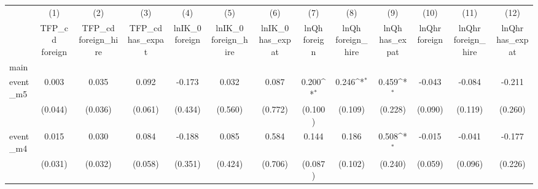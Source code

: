 {
\def\sym#1{\ifmmode^{#1}\else\(^{#1}\)\fi}
\begin{tabular}{l*{12}{c}}
\hline\hline
            &\multicolumn{1}{c}{(1)}&\multicolumn{1}{c}{(2)}&\multicolumn{1}{c}{(3)}&\multicolumn{1}{c}{(4)}&\multicolumn{1}{c}{(5)}&\multicolumn{1}{c}{(6)}&\multicolumn{1}{c}{(7)}&\multicolumn{1}{c}{(8)}&\multicolumn{1}{c}{(9)}&\multicolumn{1}{c}{(10)}&\multicolumn{1}{c}{(11)}&\multicolumn{1}{c}{(12)}\\
            &\multicolumn{1}{c}{TFP\_cd  foreign}&\multicolumn{1}{c}{TFP\_cd  foreign\_hire}&\multicolumn{1}{c}{TFP\_cd  has\_expat}&\multicolumn{1}{c}{lnIK\_0  foreign}&\multicolumn{1}{c}{lnIK\_0  foreign\_hire}&\multicolumn{1}{c}{lnIK\_0  has\_expat}&\multicolumn{1}{c}{lnQh  foreign}&\multicolumn{1}{c}{lnQh  foreign\_hire}&\multicolumn{1}{c}{lnQh  has\_expat}&\multicolumn{1}{c}{lnQhr  foreign}&\multicolumn{1}{c}{lnQhr  foreign\_hire}&\multicolumn{1}{c}{lnQhr  has\_expat}\\
\hline
main        &                     &                     &                     &                     &                     &                     &                     &                     &                     &                     &                     &                     \\
event\_m5    &       0.003         &       0.035         &       0.092         &      -0.173         &       0.032         &       0.087         &       0.200\sym{*}  &       0.246\sym{*}  &       0.459\sym{*}  &      -0.043         &      -0.084         &      -0.211         \\
            &     (0.044)         &     (0.036)         &     (0.061)         &     (0.434)         &     (0.560)         &     (0.772)         &     (0.100)         &     (0.109)         &     (0.228)         &     (0.090)         &     (0.119)         &     (0.260)         \\
[1em]
event\_m4    &       0.015         &       0.030         &       0.084         &      -0.188         &       0.085         &       0.584         &       0.144         &       0.186         &       0.508\sym{*}  &      -0.015         &      -0.041         &      -0.177         \\
            &     (0.031)         &     (0.032)         &     (0.058)         &     (0.351)         &     (0.424)         &     (0.706)         &     (0.087)         &     (0.102)         &     (0.240)         &     (0.059)         &     (0.096)         &     (0.226)         \\

\end{tabular}}
